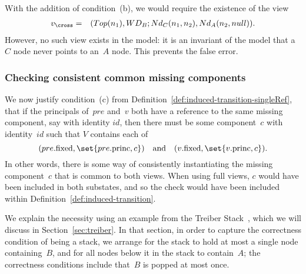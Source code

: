 {With the addition of condition~(b), we would require the existence of the view
\begin{eqnarray*}
v_\cross & = &  (Top(n_1), WD_B ; Nd_C(n_1, n_2), Nd_A(n_2, null)).
\end{eqnarray*}
%
However, no such view exists in the model: it is an invariant of the model
that a $C$ node never points to an~$A$ node.  This prevents the false error.




\subsubsection{Checking consistent common missing components}
\label{ssec:missing-common}

We now justify condition~(c) from
Definition~\ref{def:induced-transition-singleRef}, that if the principals
of~$pre$ and~$v$ both have a reference to the same missing component, say with
identity $id$, then there must be some component~$c$ with identity~$id$ such
that $V$ contains each of
\[
(pre.\fixed, \set{pre.\princ, c}) \quad\mbox{and}\quad 
(v.\fixed, \set{v.\princ, c}).
\]
In other words, there is some way of consistently instantiating the missing
component~$c$ that is common to both views. When using full views,
$c$ would have been included in both substates, and so the check would have
been included within Definition~\ref{def:induced-transition}.



We explain the necessity using an example from the Treiber
Stack~\cite{treiber}, which we will discuss in Section~\ref{sec:treiber}.  In
that section, in order to capture the correctness condition of being a stack,
we arrange for the stack to hold at most a single node containing~$B$, and for
all nodes below it in the stack to contain~$A$; the correctness conditions
include that~$B$ is popped at most once.

}
